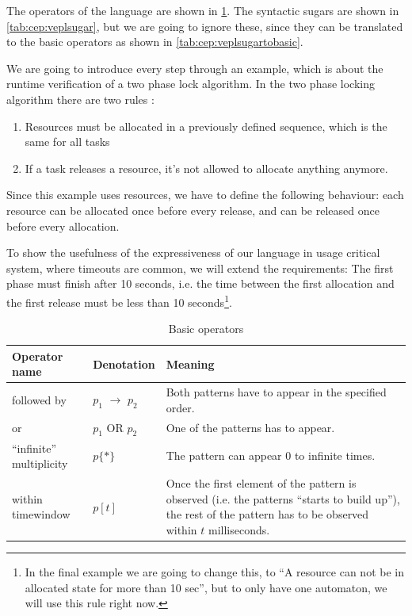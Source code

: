		
		The operators of the language are shown in \cref{tab:cep:veplop}. 
		The syntactic sugars are shown in \cref{tab:cep:veplsugar},
		but we are going to ignore these, since they can be translated to the basic operators as shown in \cref{tab:cep:veplsugartobasic}.
		
		We are going to introduce every step through an example, which is about the runtime verification of a two phase lock algorithm. %
		In the two phase locking algorithm there are two rules :
		\begin{enumerate}
			\item Resources must be allocated in a previously defined sequence, which is the same for all tasks
			\item If a task releases a resource, it's not allowed to allocate anything anymore.
		\end{enumerate}
		
		Since this example uses resources, we have to define the following behaviour:
		each resource can be allocated once before every release, and can be released once before every allocation.
		
		To show the usefulness of the expressiveness of our language in usage critical system, where timeouts are common, we will extend the requirements:
		The first phase must finish after 10 seconds,
		i.e. the time between the first allocation and the first release must be less than 10 seconds\footnote{In the final 
		example we are going to change this, to ``A resource can not be in allocated state for more than 10 sec'', but to 
		only have one automaton, we will use this rule right now.}.
		
			
		\begin{table}
		\caption{Basic operators}		
		\label{tab:cep:veplop}
			\begin{tabularx}{\textwidth}{llX}
				\toprule
				Operator name &	Denotation & Meaning \\
				\midrule
				followed by & $p_1$ $\rightarrow$ $p_2$ & Both patterns have to appear in the specified order. \\
				or & $p_1$ OR $p_2$ &	One of the patterns has to appear. \\
				``infinite'' multiplicity & $p\{\ast\}$ & The pattern can appear 0 to infinite times. \\
				within timewindow &	$p[t]$ & Once the first element of the pattern is observed (i.e. the patterns ``starts to build up''), the rest of the pattern has to be observed within $t$ milliseconds. \\
				\bottomrule
			\end{tabularx}
		\end{table}

